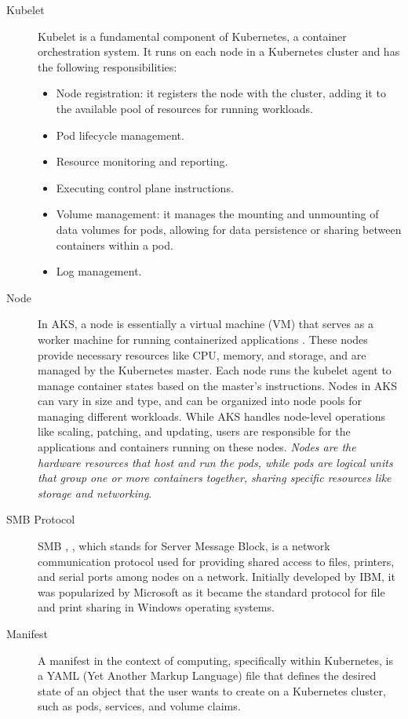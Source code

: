 \documentclass{article}
\begin{document}
\begin{description}
\item[Kubelet] Kubelet \cite{kubelet} is a fundamental component of Kubernetes, a container orchestration system. It runs on each node in a Kubernetes cluster and has the following responsibilities:
\begin{itemize}
 \item Node registration: it registers the node with the cluster, adding it to the available pool of resources for running workloads.
 \item Pod lifecycle management.
 \item Resource monitoring and reporting.
 \item Executing control plane instructions.
 \item Volume management: it manages the mounting and unmounting of data volumes for pods, allowing for data persistence or sharing between containers within a pod.
 \item Log management. 
\end{itemize} 
\item[Node] 
In AKS, a node is essentially a virtual machine (VM) that serves as a worker machine for running containerized applications \cite{kubazure}. These nodes provide necessary resources like CPU, memory, and storage, and are managed by the Kubernetes master. Each node runs the kubelet agent to manage container states based on the master's instructions. Nodes in AKS can vary in size and type, and can be organized into node pools for managing different workloads. While AKS handles node-level operations like scaling, patching, and updating, users are responsible for the applications and containers running on these nodes. \textit{Nodes are the hardware resources that host and run the pods, while pods are logical units that group one or more containers together, sharing specific resources like storage and networking}.

\item[SMB Protocol] SMB \cite{smb}, \cite{smbprotocol}, which stands for Server Message Block, is a network communication protocol used for providing shared access to files, printers, and serial ports among nodes on a network. Initially developed by IBM, it was popularized by Microsoft as it became the standard protocol for file and print sharing in Windows operating systems.
\item[Manifest] A manifest \cite{kubazure} in the context of computing, specifically within Kubernetes, is a YAML (Yet Another Markup Language) file that defines the desired state of an object that the user wants to create on a Kubernetes cluster, such as pods, services, and volume claims. 


\end{description}
\end{document}
